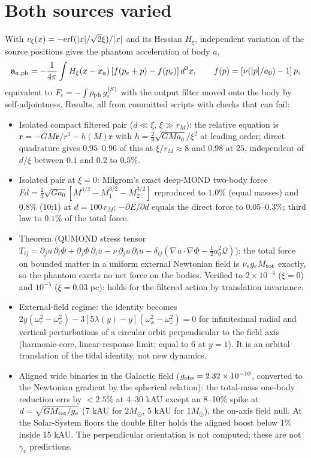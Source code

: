 \documentclass[11pt,letterpaper]{article}
\begin{document}
\section{Both sources varied}
With $v_\xi(x)=-{\rm erf}(|x|/\sqrt2\xi)/|x|$ and its Hessian $H_\xi$, independent variation of the source positions gives the phantom acceleration of body $a$,
\begin{equation}
\mathbf a_{a,{\rm ph}}=-\frac{1}{4\pi}\int H_\xi(x-x_a)\,[f(p_e+p)-f(p_e)]\,d^3x,\qquad f(p)=[\nu(|p|/a_0)-1]\,p,
\end{equation}
equivalent to $F_i=-\int\rho_{\rm ph}\,g_i^{(S)}$ with the output filter moved onto the body by self-adjointness. Results, all from committed scripts with checks that can fail:
\begin{itemize}
\item Isolated compact filtered pair ($d\ll\xi$, $\xi\gg r_M$): the relative equation is $\ddot{\mathbf r}=-GM\mathbf r/r^3-h(M)\mathbf r$ with $h=\tfrac29\sqrt{GMa_0}/\xi^2$ at leading order; direct quadrature gives $0.95$--$0.96$ of this at $\xi/r_M\approx8$ and $0.98$ at $25$, independent of $d/\xi$ between $0.1$ and $0.2$ to $0.5\%$.
\item Isolated pair at $\xi=0$: Milgrom's exact deep-MOND two-body force $Fd=\tfrac23\sqrt{Ga_0}[M^{3/2}-M_1^{3/2}-M_2^{3/2}]$ reproduced to $1.0\%$ (equal masses) and $0.8\%$ (10:1) at $d=100\,r_M$; $-\partial E/\partial d$ equals the direct force to $0.05$--$0.3\%$; third law to $0.1\%$ of the total force.
\item Theorem (QUMOND stress tensor $T_{ij}=\partial_ju\,\partial_i\Phi+\partial_j\Phi\,\partial_iu-\nu\,\partial_ju\,\partial_iu-\delta_{ij}(\nabla u\cdot\nabla\Phi-\tfrac12a_0^2\mathcal Q)$): the total force on bounded matter in a uniform external Newtonian field is $\nu_e g_e M_{\rm tot}$ exactly, so the phantom exerts no net force on the bodies. Verified to $2\times10^{-4}$ ($\xi=0$) and $10^{-5}$ ($\xi=0.03$ pc); holds for the filtered action by translation invariance.
\item External-field regime: the identity becomes $2y(\omega_r^2-\omega_\phi^2)-3[5\lambda(y)-y](\omega_\phi^2-\omega_z^2)=0$ for infinitesimal radial and vertical perturbations of a circular orbit perpendicular to the field axis (harmonic-core, linear-response limit; equal to 6 at $y=1$). It is an orbital translation of the tidal identity, not new dynamics.
\item Aligned wide binaries in the Galactic field ($g_{\rm obs}=2.32\times10^{-10}$, converted to the Newtonian gradient by the spherical relation): the total-mass one-body reduction errs by $<2.5\%$ at 4--30 kAU except an 8--10\% spike at $d=\sqrt{GM_{\rm tot}/g_e}$ (7 kAU for $2M_\odot$, 5 kAU for $1M_\odot$), the on-axis field null. At the Solar-System floors the double filter holds the aligned boost below 1\% inside 15 kAU. The perpendicular orientation is not computed; these are not $\gamma_v$ predictions.
\end{itemize}
\end{document}
